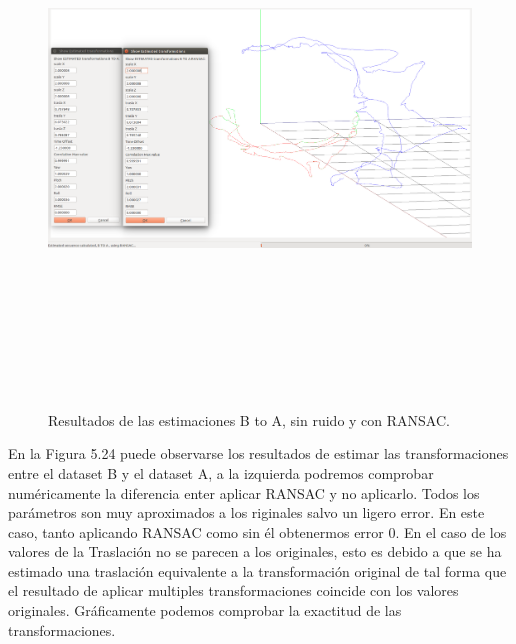 \begin{figure}[H]
\begin{center}
\label{fig:opciones de View}\includegraphics[height=14.0cm,width=18.0cm]{img/cap6/newData_EscalaTraslaRota_BA.png}
\hspace{0.5cm}

\end{center}

\caption{Resultados de las estimaciones B to A, sin ruido y con RANSAC.}
\end{figure}

En la Figura 5.24 puede observarse los resultados de estimar las transformaciones entre el dataset B y el dataset A, a la izquierda podremos comprobar numéricamente la diferencia enter aplicar RANSAC y no aplicarlo. Todos los parámetros son muy aproximados a los riginales salvo un ligero error. En este caso, tanto aplicando RANSAC como sin él obtenermos error 0. En el caso de los valores de la Traslación no se parecen a los originales, esto es debido a que se ha estimado una traslación equivalente a la transformación original de tal forma que el resultado de aplicar multiples transformaciones coincide con los valores originales. Gráficamente podemos comprobar la exactitud de las transformaciones.

